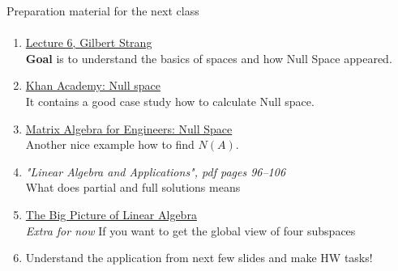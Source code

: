 \documentclass[aspectratio=169]{beamer}
\newcommand{\fbckg}[1]{\usebackgroundtemplate{\texttt{[image: \#1]}}}%
\begin{document}
\begin{frame}[t]{Preparation material for the next class}
\framesubtitle{}
    \vspace{-0.35cm}
    \small
    \begin{enumerate}
        \item \href{https://youtu.be/8o5Cmfpeo6g}{Lecture 6, Gilbert Strang} \\ \textbf{Goal} is to understand the basics of spaces and how Null Space appeared.
        \item \href{https://www.youtube.com/watch?v=_uTAdf_AsfQ}{Khan Academy: Null space} \\ It contains a good case study how to calculate Null space.
        \item \href{https://www.youtube.com/watch?v=C8zOd07U3l8}{Matrix Algebra for Engineers: Null Space} \\ Another nice example how to find $N(A)$.
        \item \textit{"Linear Algebra and Applications", pdf pages 96--106 } \\ What does partial and full solutions means
        \item \href{https://www.youtube.com/watch?v=ggWYkes-n6E}{The Big Picture of Linear Algebra} \\ \textit{Extra for now} If you want to get the global view of four subspaces
        \item Understand the application from next few slides and make HW tasks!
    \end{enumerate}
\end{frame}

\fbckg{fibeamer/figs/last_page.png}
\frame[plain]{}
\end{document}
